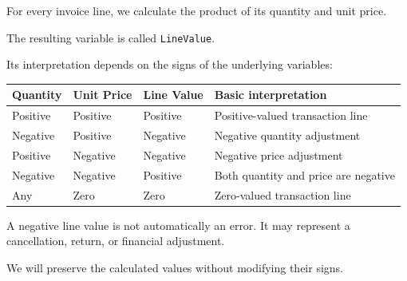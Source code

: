 \documentclass[11pt]{article}
\begin{document}
For every invoice line, we calculate the product of its quantity and
unit price.

The resulting variable is called \texttt{LineValue}.

Its interpretation depends on the signs of the underlying variables:

{\def\LTcaptype{none} %
\begin{longtable}[]{@{}
  >{\raggedleft\arraybackslash}p{}
  >{\raggedleft\arraybackslash}p{}
  >{\raggedleft\arraybackslash}p{}
  >{\raggedright\arraybackslash}p{}@{}}
\toprule\noalign{}
\begin{minipage}[b]{\linewidth}\raggedleft
Quantity
\end{minipage} & \begin{minipage}[b]{\linewidth}\raggedleft
Unit Price
\end{minipage} & \begin{minipage}[b]{\linewidth}\raggedleft
Line Value
\end{minipage} & \begin{minipage}[b]{\linewidth}\raggedright
Basic interpretation
\end{minipage} \\
\midrule\noalign{}
\endhead
\bottomrule\noalign{}
\endlastfoot
Positive & Positive & Positive & Positive-valued transaction line \\
Negative & Positive & Negative & Negative quantity adjustment \\
Positive & Negative & Negative & Negative price adjustment \\
Negative & Negative & Positive & Both quantity and price are negative \\
Any & Zero & Zero & Zero-valued transaction line \\
\end{longtable}
}

A negative line value is not automatically an error. It may represent a
cancellation, return, or financial adjustment.

We will preserve the calculated values without modifying their signs.
\end{document}
